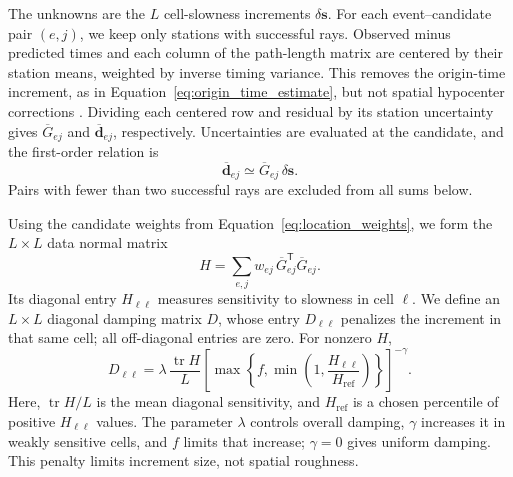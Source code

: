 \documentclass[12pt, a4paper]{article}
\begin{document}
The unknowns are the $L$ cell-slowness increments $\delta\mathbf s$. For each event--candidate pair $(e,j)$, we keep only stations with successful rays. Observed minus predicted times and each column of the path-length matrix are centered by their station means, weighted by inverse timing variance. This removes the origin-time increment, as in Equation~\ref{eq:origin_time_estimate}, but not spatial hypocenter corrections \parencite{pavlis1980}. Dividing each centered row and residual by its station uncertainty gives $\overline G_{ej}$ and $\overline{\mathbf d}_{ej}$, respectively. Uncertainties are evaluated at the candidate, and the first-order relation is
\begin{equation}
\overline{\mathbf d}_{ej}\simeq\overline G_{ej}\,\delta\mathbf s.
\label{eq:linearized_data}
\end{equation}
Pairs with fewer than two successful rays are excluded from all sums below.

Using the candidate weights from Equation~\ref{eq:location_weights}, we form the $L\times L$ data normal matrix
\begin{equation}
H=\sum_{e,j}w_{ej}\,\overline G_{ej}^{\mathsf T}\overline G_{ej}.
\label{eq:data_normal_matrix}
\end{equation}
Its diagonal entry $H_{\ell\ell}$ measures sensitivity to slowness in cell $\ell$. We define an $L\times L$ diagonal damping matrix $D$, whose entry $D_{\ell\ell}$ penalizes the increment in that same cell; all off-diagonal entries are zero. For nonzero $H$,
\begin{equation}
D_{\ell\ell}=\lambda\,\frac{\operatorname{tr}H}{L}
\left[\max\!\left\{f,\min\!\left(1,\frac{H_{\ell\ell}}{H_{\mathrm{ref}}}\right)\right\}\right]^{-\gamma}.
\label{eq:adaptive_damping}
\end{equation}
Here, $\operatorname{tr}H/L$ is the mean diagonal sensitivity, and $H_{\mathrm{ref}}$ is a chosen percentile of positive $H_{\ell\ell}$ values. The parameter $\lambda$ controls overall damping, $\gamma$ increases it in weakly sensitive cells, and $f$ limits that increase; $\gamma=0$ gives uniform damping. This penalty limits increment size, not spatial roughness.
\end{document}
